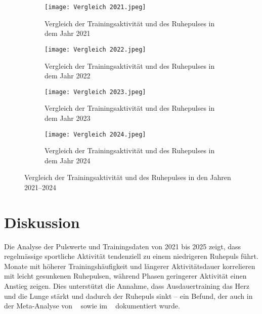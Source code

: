 \documentclass[a4paper,12pt]{scrartcl}
\begin{document}
\begin{landscape}
\begin{figure}[ht]

		\centering
		\begin{subfigure}[b]{0.65\textwidth}
			\centering
			\texttt{[image: Vergleich 2021.jpeg]}
			\caption{Vergleich der Trainingsaktivität und des Ruhepulses in dem Jahr 2021}
			\label{fig:bild1}
		\end{subfigure}
		\hspace{0.2\textwidth}
		\begin{subfigure}[b]{0.65\textwidth}
			\centering
			\texttt{[image: Vergleich 2022.jpeg]}
			\caption{Vergleich der Trainingsaktivität und des Ruhepulses in dem Jahr 2022}
			\label{fig:bild2}
		\end{subfigure}
		
		\vspace{0.5em}  %
		
		
		\begin{subfigure}[b]{0.65\textwidth}
			\centering
			\texttt{[image: Vergleich 2023.jpeg]}
			\caption{Vergleich der Trainingsaktivität und des Ruhepulses in dem Jahr 2023}
			\label{fig:bild3}
		\end{subfigure}
		\hspace{0.2\textwidth}
		\begin{subfigure}[b]{0.65\textwidth}
			\centering
			\texttt{[image: Vergleich 2024.jpeg]}
			\caption{Vergleich der Trainingsaktivität und des Ruhepulses in dem Jahr 2024}
			\label{fig:bild4}
		\end{subfigure}
	
	\caption{Vergleich der Trainingsaktivität und des Ruhepulses in den Jahren 2021–2024}
	\label{fig:gesamtvergleich}
 
\end{figure}
\end{landscape}


\section{Diskussion}
Die Analyse der Pulswerte und Trainingsdaten von 2021 bis 2025 zeigt, dass regelmässige sportliche Aktivität tendenziell zu einem niedrigeren Ruhepuls führt. Monate mit höherer Trainingshäufigkeit und längerer Aktivitätsdauer korrelieren mit leicht gesunkenen Ruhepulsen, während Phasen geringerer Aktivität einen Anstieg zeigen. Dies unterstützt die Annahme, dass Ausdauertraining das Herz und die Lunge stärkt und dadurch der Ruhepuls sinkt – ein Befund, der auch in der Meta-Analyse von ~\cite{Reimers2018} sowie im ~\cite{Navarro2022} dokumentiert wurde.
\end{document}
